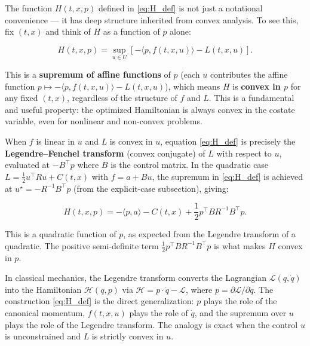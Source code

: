 \documentclass{article}
\begin{document}
\begin{mathrequirementsbox}
The function $H(t, x, p)$ defined in \eqref{eq:H_def} is not just a notational
convenience --- it has deep structure inherited from convex analysis. To see this,
fix $(t, x)$ and think of $H$ as a function of $p$ alone:

\begin{equation}
    H(t, x, p) = \sup_{u \in U} \left[ -\langle p, f(t,x,u) \rangle
    - L(t,x,u) \right].
    \label{eq:H_def}
\end{equation}

This is a \textbf{supremum of affine functions} of $p$ (each $u$ contributes the
affine function $p \mapsto -\langle p, f(t,x,u)\rangle - L(t,x,u)$), which means
$H$ is \textbf{convex in $p$} for any fixed $(t,x)$, regardless of the structure
of $f$ and $L$. This is a fundamental and useful property: the optimized
Hamiltonian is always convex in the costate variable, even for nonlinear and
non-convex problems.

When $f$ is linear in $u$ and $L$ is convex in $u$, equation \eqref{eq:H_def}
is precisely the \textbf{Legendre--Fenchel transform} (convex conjugate) of $L$
with respect to $u$, evaluated at $-B^\top p$ where $B$ is the control matrix.
In the quadratic case $L = \frac{1}{2}u^\top R u + C(t,x)$ with $f = a + Bu$,
the supremum in \eqref{eq:H_def} is achieved at $u^\star = -R^{-1}B^\top p$
(from the explicit-case subsection), giving:

\begin{equation}
    H(t, x, p) = -\langle p, a \rangle - C(t,x)
    + \frac{1}{2} p^\top B R^{-1} B^\top p.
\end{equation}

This is a quadratic function of $p$, as expected from the Legendre transform of
a quadratic. The positive semi-definite term $\frac{1}{2}p^\top B R^{-1} B^\top
p$ is what makes $H$ convex in $p$.

In classical mechanics, the Legendre transform converts the Lagrangian
$\mathcal{L}(q, \dot{q})$ into the Hamiltonian $\mathcal{H}(q, p)$ via $\mathcal{H}
= p \cdot \dot{q} - \mathcal{L}$, where $p = \partial \mathcal{L}/\partial \dot{q}$.
The construction \eqref{eq:H_def} is the direct generalization: $p$ plays the role
of the canonical momentum, $f(t,x,u)$ plays the role of $\dot{q}$, and the
supremum over $u$ plays the role of the Legendre transform. The analogy is
exact when the control $u$ is unconstrained and $L$ is strictly convex in $u$.
\end{mathrequirementsbox}
\end{document}
